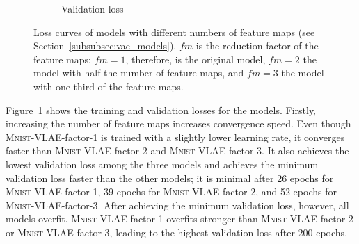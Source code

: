 \begin{figure}
\begin{subfigure}{.45\textwidth}
        \caption{Validation loss}
    \end{subfigure}
    \caption[Sparse Models - Loss Curves]{Loss curves of models with different numbers of feature maps (see Section~\ref{subsubsec:vae_models}). $fm$ is the reduction factor of the feature maps; $fm=1$, therefore, is the original model, $fm=2$ the model with half the number of feature maps, and $fm=3$ the model with one third of the feature maps.}
    \label{fig:learning_curves_sparseness}
\end{figure}


Figure~\ref{fig:learning_curves_sparseness} shows the training and validation losses for the models.
Firstly, increasing the number of feature maps increases convergence speed.
Even though \textsc{Mnist}-\ac{VLAE}-factor-1 is trained with a slightly lower learning rate, it converges faster than \textsc{Mnist}-\ac{VLAE}-factor-2 and \textsc{Mnist}-\ac{VLAE}-factor-3.
It also achieves the lowest validation loss among the three models and achieves the minimum validation loss faster than the other models; it is minimal after 26 epochs for \textsc{Mnist}-\ac{VLAE}-factor-1, 39 epochs for \textsc{Mnist}-\ac{VLAE}-factor-2, and 52 epochs for \textsc{Mnist}-\ac{VLAE}-factor-3.
After achieving the minimum validation loss, however, all models overfit.
\textsc{Mnist}-\ac{VLAE}-factor-1 overfits stronger than \textsc{Mnist}-\ac{VLAE}-factor-2 or \textsc{Mnist}-\ac{VLAE}-factor-3, leading to the highest validation loss after 200 epochs.

